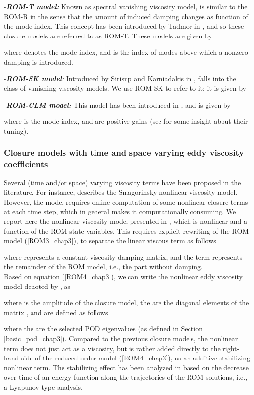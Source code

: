 \documentclass[letterpaper,conference,onecolumn,11pt]{IEEEtran}
\begin{document}
{-\bf\it ROM-T model:} Known as spectral vanishing viscosity
model, is similar to the ROM-R in the sense that the amount of
induced damping changes as function of the mode index. This
concept has been introduced by Tadmor in \cite{T89}, and so these
closure models are referred to as ROM-T. These models are given by

where  denotes the mode index, and  is the index of
modes above which a nonzero damping is introduced.

{-\bf\it ROM-SK model:} Introduced by Sirisup and Karniadakis in
\cite{SK04}, falls into the class of vanishing viscosity models.
We use ROM-SK to refer to it; it is given by


{-\bf\it ROM-CLM model:} This model has been introduced in
\cite{C84,LM96}, and is given by

where  is the mode index, and
 are positive
gains (see \cite{KK00,C84} for some insight about their tuning).



\subsubsection{Closure models with time and space varying eddy
viscosity coefficients}

Several (time and/or space) varying viscosity terms have been proposed
in the literature. For instance, \cite{SI13} describes the Smagorinsky
nonlinear viscosity model. However, the model requires online
computation of some nonlinear closure terms at each time step, which
in general makes it computationally consuming. We report here the
nonlinear viscosity model presented in \cite{CNTLDBDN13}, which is
nonlinear and a function of the ROM state variables. This requires
explicit rewriting of the ROM model (\ref{ROM3_chap3}), to separate
the linear viscous term as follows

where  represents a constant viscosity
damping matrix, and the term  represents the remainder
of the ROM model, i.e., the part without damping. \\Based on
equation (\ref{ROM4_chap3}), we can write the nonlinear eddy
viscosity model denoted by , as

where  is the amplitude of the closure model, the
 are the diagonal elements of the matrix
, and  are defined as follows


where the  are the selected POD eigenvalues (as
defined in Section \ref{basic_pod_chap3}). Compared to the
previous closure models, the nonlinear term  does not
just act as a viscosity, but is rather added directly to the
right-hand side of the reduced order model (\ref{ROM4_chap3}), as
an additive stabilizing nonlinear term. The stabilizing effect has
been analyzed in \cite{CNTLDBDN13} based on the decrease over time
of an energy function along the trajectories of the ROM solutions,
i.e., a Lyapunov-type analysis.
\end{document}

